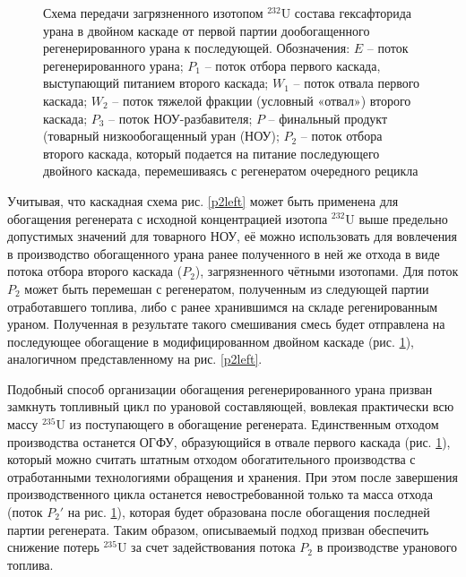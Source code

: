 \begin{figure}[ht]
    \caption{Схема передачи загрязненного изотопом $^{232}$U состава гексафторида урана в двойном каскаде от первой партии дообогащенного регенерированного урана к последующей. Обозначения: $E$ -- поток регенерированного урана; $P_1$ -- поток отбора первого каскада, выступающий питанием второго каскада; $W_1$ -- поток отвала первого каскада; $W_2$ -- поток тяжелой фракции (условный «отвал») второго каскада; $P_3$ -- поток НОУ-разбавителя; $P$ -- финальный продукт (товарный низкообогащенный уран (НОУ); $P_2$ -- поток отбора второго каскада, который подается на питание последующего двойного каскада, перемешиваясь с регенератом очередного рецикла}\label{P2utilizationRing}
\end{figure}

Учитывая, что каскадная схема рис. \ref{p2left} может быть применена для обогащения регенерата с исходной концентрацией изотопа $^{232}$U выше предельно допустимых  значений для товарного НОУ, её можно использовать для вовлечения в производство обогащенного урана ранее полученного в ней же отхода в виде потока отбора второго каскада ($P_2$), загрязненного чётными изотопами. Для поток $P_2$ может быть перемешан с регенератом, полученным из следующей партии отработавшего топлива, либо с ранее хранившимся на складе регенированным ураном. Полученная в результате такого смешивания смесь будет отправлена на последующее обогащение в модифицированном двойном каскаде (рис. \ref{P2utilizationRing}), аналогичном представленному на рис. \ref{p2left}.  

Подобный способ организации обогащения регенерированного урана призван замкнуть топливный цикл по урановой составляющей, вовлекая практически всю массу $^{235}$U из поступающего в обогащение регенерата. Единственным отходом производства останется ОГФУ, образующийся в отвале первого каскада (рис. \ref{P2utilizationRing}), который можно считать штатным отходом обогатительного производства с отработанными технологиями обращения и хранения. При этом после завершения производственного цикла останется невостребованной только та масса отхода (поток ${P_2}'$ на рис. \ref{P2utilizationRing}), которая будет образована после обогащения последней партии регенерата. Таким образом, описываемый подход призван обеспечить снижение потерь $^{235}$U за счет задействования потока ${P_2}$ в производстве уранового топлива.

